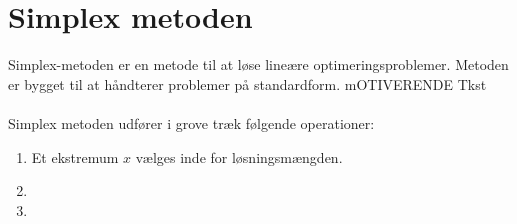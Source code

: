 \chapter{Simplex metoden}
%
Simplex-metoden er en metode til at løse lineære optimeringsproblemer.
Metoden er bygget til at håndterer problemer på standardform.
mOTIVERENDE Tkst\\\\
%
Simplex metoden udfører i grove træk følgende operationer:
%
\begin{enumerate}
\item Et ekstremum $x$ vælges inde for løsningsmængden.
\item
\item
\end{enumerate}
%
